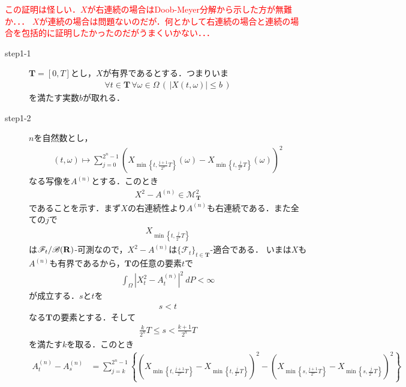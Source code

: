 	\begin{sketch}
			\textcolor{red}{この証明は怪しい．$X$が右連続の場合はDoob-Meyer分解から示した方が無難か．．．
			$X$が連続の場合は問題ないのだが．何とかして右連続の場合と連続の場合を包括的に証明したかったのだがうまくいかない．．．}
		\begin{description}
			\item[step1-1] $\mathbf{T}=[0,T]$とし，$X$が有界であるとする．つまりいま
				\begin{align}
					\forall t \in \mathbf{T}\, \forall \omega \in \Omega\,
					\left(\, |X(t,\omega)| \leq b\, \right)
				\end{align}
				を満たす実数$b$が取れる．
			
			\item[step1-2] $n$を自然数とし，
				\begin{align}
					(t,\omega) \longmapsto \sum_{j=0}^{2^n-1} \left(X_{\min\left\{t,\frac{j+1}{2^n}T\right\}}(\omega)
					- X_{\min\left\{t,\frac{j}{2^n}T\right\}}(\omega)\right)^2
				\end{align}
				なる写像を$A^{(n)}$とする．このとき
				\begin{align}
					X^2 - A^{(n)} \in \mathscr{M}^2_{\mathbf{T}}
					\label{fom:thm_decomposition_of_square_integrable_martingales_2}
				\end{align}
				であることを示す．まず$X$の右連続性より$A^{(n)}$も右連続である．また全ての$j$で
				\begin{align}
					X_{\min\left\{t,\frac{j}{2^n}T\right\}}
				\end{align}
				は$\mathscr{F}_t/\mathscr{B}(\mathbf{R})$-可測なので，$X^2-A^{(n)}$は$\{\mathscr{F}_t\}_{t \in \mathbf{T}}$-適合である．
				いまは$X$も$A^{(n)}$も有界であるから，$\mathbf{T}$の任意の要素$t$で
				\begin{align}
					\int_{\Omega} \left|X_t^2-A_t^{(n)}\right|^2\ dP < \infty
				\end{align}
				が成立する．$s$と$t$を
				\begin{align}
					s < t
				\end{align}
				なる$\mathbf{T}$の要素とする．そして
				\begin{align}
					\frac{k}{2^n}T \leq s < \frac{k+1}{2^n}T
				\end{align}
				を満たす$k$を取る．このとき
				\begin{align}
					A^{(n)}_t - A^{(n)}_s
					&= \sum_{j=k}^{2^n-1} \left\{
					\left(X_{\min\left\{t,\frac{j+1}{2^n}T\right\}} - X_{\min\left\{t,\frac{j}{2^n}T\right\}}\right)^2
					- \left(X_{\min\left\{s,\frac{j+1}{2^n}T\right\}} - X_{\min\left\{s,\frac{j}{2^n}T\right\}}\right)^2\right\} \\

\end{align}
\end{description}
\end{sketch}
